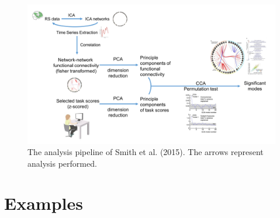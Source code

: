 \begin{figure}[H]
	\centering
	\includegraphics[width=1\textwidth]{cca/image/ccafig2.png}
	\caption{The analysis pipeline of Smith et al. (2015). The arrows represent analysis performed.}

	\label{fig:methods:fig2}
\end{figure}

\section{Examples}

